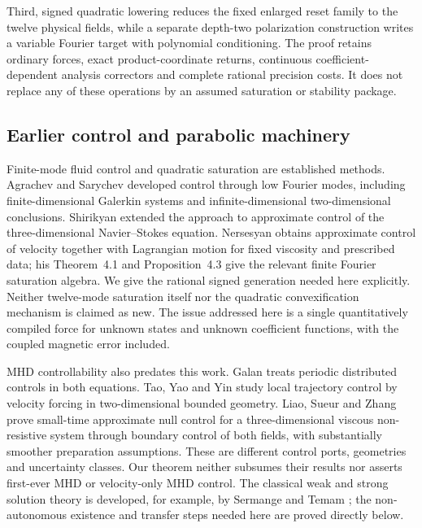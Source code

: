 \documentclass[11pt,a4paper]{amsart}
\theoremstyle{definition}
\theoremstyle{remark}
\numberwithin{equation}{section}
\begin{document}
Third, signed quadratic lowering reduces the fixed enlarged reset family to the twelve physical fields, while a separate depth-two polarization construction writes a variable Fourier target with polynomial conditioning. The proof retains ordinary forces, exact product-coordinate returns, continuous coefficient-dependent analysis correctors and complete rational precision costs. It does not replace any of these operations by an assumed saturation or stability package.

\subsection{Earlier control and parabolic machinery}
Finite-mode fluid control and quadratic saturation are established methods. Agrachev and Sarychev \cite{AS2005} developed control through low Fourier modes, including finite-dimensional Galerkin systems and infinite-dimensional two-dimensional conclusions. Shirikyan \cite{Shirikyan2006} extended the approach to approximate control of the three-dimensional Navier--Stokes equation. Nersesyan \cite[Theorem~2.2]{Nersesyan2015} obtains approximate control of velocity together with Lagrangian motion for fixed viscosity and prescribed data; his Theorem~4.1 and Proposition~4.3 give the relevant finite Fourier saturation algebra. We give the rational signed generation needed here explicitly. Neither twelve-mode saturation itself nor the quadratic convexification mechanism is claimed as new. The issue addressed here is a single quantitatively compiled force for unknown states and unknown coefficient functions, with the coupled magnetic error included.

MHD controllability also predates this work. Galan \cite[Theorem~2.1]{Galan2011} treats periodic distributed controls in both equations. Tao, Yao and Yin \cite{TYY2025} study local trajectory control by velocity forcing in two-dimensional bounded geometry. Liao, Sueur and Zhang \cite[Theorem~1.1]{LSZ2025} prove small-time approximate null control for a three-dimensional viscous non-resistive system through boundary control of both fields, with substantially smoother preparation assumptions. These are different control ports, geometries and uncertainty classes. Our theorem neither subsumes their results nor asserts first-ever MHD or velocity-only MHD control. The classical weak and strong solution theory is developed, for example, by Sermange and Temam \cite{ST1983}; the non-autonomous existence and transfer steps needed here are proved directly below.
\end{document}
